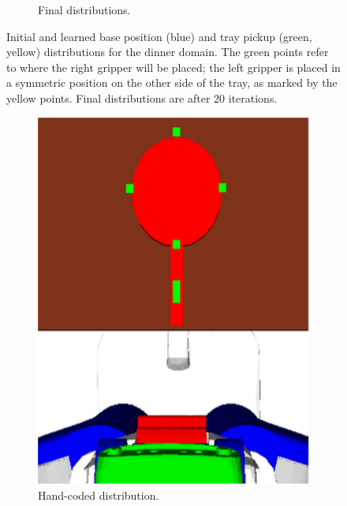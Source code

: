 \begin{figure}[t]
\begin{subfigure}[b]{0.45\linewidth}
    \caption{Final distributions.}
  \end{subfigure}
  \caption{\small{Initial and learned base position (blue) and tray pickup (green, yellow) distributions
for the dinner domain. The green points refer to where the right gripper will be placed; the left gripper is
placed in a symmetric position on the other side of the tray, as marked by the yellow points.
Final distributions are after 20 iterations.}}
  \label{fig:dinner}
\end{figure}

\begin{figure}[t]
  \centering
  \begin{subfigure}[b]{0.25\linewidth}
    \includegraphics[width=\textwidth]{images/frying_hand.png}
    \caption{Hand-coded distribution.}
  \end{subfigure}
  \begin{subfigure}[b]{0.25\linewidth}

\end{subfigure}
\end{figure}
